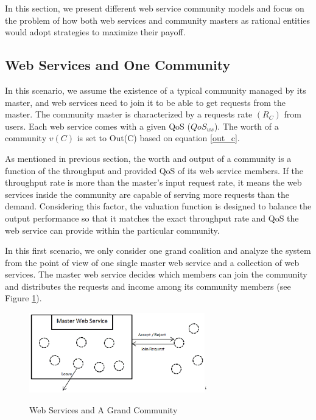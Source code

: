 In this section, we present different web service community models
and focus on the problem of how both web services and community
masters as rational entities would adopt strategies to maximize
their payoff.

\subsection {Web Services and One Community}

In this scenario, we assume the existence of a typical community
managed by its master, and web services need to join it to be able
to get requests from the master. The community master is
characterized by a requests rate $(R_{C})$ from users. Each web
service comes with a given QoS ($QoS_{ws}$). The worth of a community
$v(C)$ is set to Out(C) based on equation \ref{out_c}.

As mentioned in previous section, the worth and output of a
community  is a function of the
throughput and provided QoS of its web service members. If the throughput rate is more than
the master's input request rate, it means the web services inside
the community are capable of serving more requests than the
demand. Considering this factor, the valuation function is
designed to balance the output performance so that it matches the
exact throughput rate and QoS the web service can provide within
the particular community.

In this first scenario, we only consider one grand coalition and
analyze the system from the point of view of one single master web
service and a collection of web services. The master web service
decides which members can join
the community and distributes the requests and income among its
community members (see Figure \ref{fig_sim1}).

\begin{figure}[!t]
\centering
\includegraphics[width=3in]{Figures/s1.eps}`
\caption{Web Services and A Grand Community}
\label{fig_sim1}
\end{figure}

